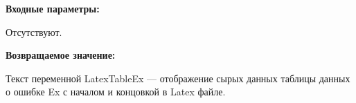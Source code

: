 \textbf{Входные параметры:}

Отсутствуют.

\textbf{Возвращаемое значение:}

Текст переменной LatexTableEx --- отображение сырых данных таблицы данных о ошибке Ex с началом и концовкой в Latex файле.